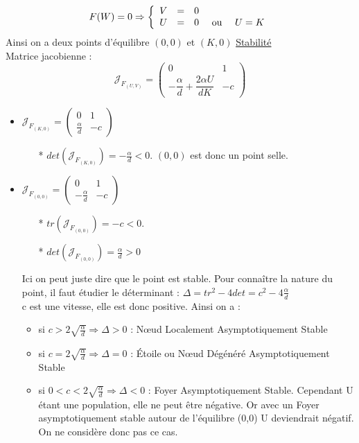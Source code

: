 \documentclass[a4paper,11pt]{article}
\begin{document}
\[
F(W)=0 \Rightarrow
\left\{
\begin{array}{r c l}
V &=& 0\\
U &=& 0 \quad \text{  ou } \quad U = K
\end{array}
\right.
\]
Ainsi on a deux points d'équilibre $(0,0)$ et $(K,0)$
\newline
\newline
\underline{Stabilité}\\
Matrice jacobienne : $$\mathcal{J}_{F_{(U,V)}}=\begin{pmatrix} 0 & 1 \\ -\dfrac{\alpha}{d}+ \dfrac{2 \alpha U }{d K} & -c\end{pmatrix}$$
\newline
\begin{itemize}[label=$\bullet$]
	\item$\mathcal{J}_{F_{(K,0)}}=\begin{pmatrix} 0 & 1 \\ \frac{\alpha}{d} & -c \end{pmatrix}$\\
    \begin{itemize}
		\item[*] $det (\mathcal{J}_{F_{(K,0)}}) = - \frac{\alpha}{d} <0$. $(0,0)$ est donc un point selle.
	\end{itemize}
    \item $\mathcal{J}_{F_{(0,0)}}=\begin{pmatrix} 0 & 1 \\ - \frac{\alpha}{d} & -c \end{pmatrix}$\\
    \begin{itemize}
		\item[*] $tr (\mathcal{J}_{F_{(0,0)}})= -c <0$. 
        \item[*] $det (\mathcal{J}_{F_{(0,0)}}) = \frac{\alpha}{d}>0 $\\
    \end{itemize}
\noindent Ici on peut juste dire que le point est stable.
Pour connaître la nature du point, il faut étudier le déterminant : $\Delta = tr^2 -4 det= c^2-4 \frac{\alpha}{d}$\\
            c est une vitesse, elle est donc positive. Ainsi on a :
      	\begin{itemize}[label=$\rightarrow$]
			\item si $c>2\sqrt{\frac{\alpha}{d}} \Rightarrow \Delta >0$ : Nœud Localement Asymptotiquement Stable
            \item si $c=2\sqrt{\frac{\alpha}{d}} \Rightarrow \Delta =0$ : Étoile ou Nœud Dégénéré Asymptotiquement Stable
            \item si $0<c<2\sqrt{\frac{\alpha}{d}} \Rightarrow \Delta <0$ : Foyer Asymptotiquement Stable. Cependant U étant une population, elle ne peut être négative. Or avec un Foyer asymptotiquement stable autour de l'équilibre (0,0) U deviendrait négatif. On ne considère donc pas ce cas.
		\end{itemize}
\end{itemize}
\end{document}

